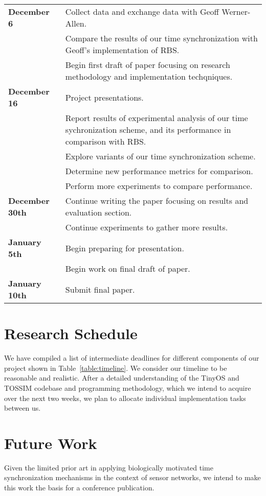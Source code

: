 \documentclass[8pt,twocolumn]{article}
\begin{document}
\begin{table*}[t]
\begin{center}
\begin{tabular}{|l|l|}
\hline
{\bf December 6} & Collect data and exchange data with Geoff Werner-Allen. \\
	& Compare the results of our time synchronization with Geoff's implementation of RBS.\\
        & Begin first draft of paper focusing on research methodology and implementation techqniques.\\
\hline
{\bf December 16} & Project presentations. \\
	&   Report results of experimental analysis of our time sychronization scheme, and its performance in comparison with RBS. \\
	&   Explore variants of our time synchronization scheme. \\
	&   Determine new performance metrics for comparison. \\
	&   Perform more experiments to compare performance. \\
\hline
{\bf December 30th} & Continue writing the paper focusing on results and evaluation section. \\
	&  Continue experiments to gather more results. \\
\hline
{\bf January 5th} & Begin preparing for presentation. \\
	&   Begin work on final draft of paper.\\
\hline
{\bf January 10th} & Submit final paper.\\
\hline
\end{tabular} 
\caption{Our Research Timeline}
\label{table:timeline}
\end{center} 
\end{table*} 


\section{Research Schedule}
We have compiled a list of intermediate deadlines for different 
components of our project shown in Table~\ref{table:timeline}. We consider 
our timeline to be reasonable and realistic.  After a detailed understanding of the TinyOS and TOSSIM
codebase and programming methodology, which we intend to acquire over the next two weeks, 
we plan to allocate individual implementation tasks between us.

\section{Future Work}
Given the limited prior art in applying biologically motivated time synchronization mechanisms
in the context of sensor networks, we intend to make this work the basis for a 
conference publication.

\smaller


\end{document}

